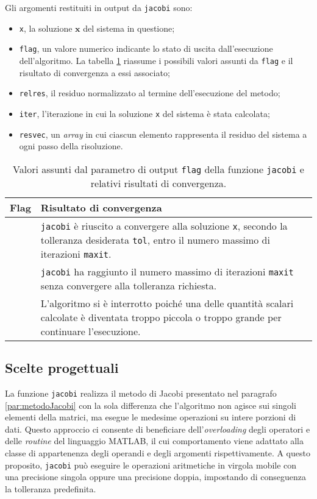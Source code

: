 Gli argomenti restituiti in output da \lstinline|jacobi| sono:
\begin{itemize}
    \item \lstinline|x|, la soluzione $\mathbf{x}$ del sistema in questione;
    \item \lstinline|flag|, un valore numerico indicante lo stato di uscita dall'esecuzione dell'algoritmo. La tabella \ref{tab:flagJacobi} riassume i possibili valori assunti da \lstinline|flag| e il risultato di convergenza a essi associato;
     \item \lstinline|relres|, il residuo normalizzato al termine dell'esecuzione del metodo;
    \item \lstinline|iter|, l'iterazione in cui la soluzione \lstinline|x| del sistema \`e stata calcolata;
    \item \lstinline|resvec|, un \textit{array} in cui ciascun elemento rappresenta il residuo del sistema a ogni passo della risoluzione.
\end{itemize}
\begin{table}[htbp]
    \renewcommand{\arraystretch}{1.2}
    \centering
    \begin{tabularx}{\textwidth}{@{} >{\centering\arraybackslash}m{1.5cm} X @{}}
        \toprule
        Flag & Risultato di convergenza \\
        \midrule
        0 & \lstinline{jacobi} è riuscito a convergere alla soluzione \lstinline{x}, secondo la tolleranza desiderata \lstinline{tol}, entro il numero massimo di iterazioni \lstinline{maxit}. \\
        \addlinespace
        1 & \lstinline{jacobi} ha raggiunto il numero massimo di iterazioni \lstinline{maxit} senza convergere alla tolleranza richiesta. \\
        \addlinespace
        2 & L'algoritmo si è interrotto poiché una delle quantità scalari calcolate è diventata troppo piccola o troppo grande per continuare l'esecuzione. \\
        \bottomrule
    \end{tabularx}
    \caption{Valori assunti dal parametro di output \lstinline{flag} della funzione \lstinline{jacobi} e relativi risultati di convergenza.}
    \label{tab:flagJacobi}
\end{table}
\subsection{Scelte progettuali}
La funzione \lstinline{jacobi} realizza il metodo di Jacobi presentato nel paragrafo \ref{par:metodoJacobi} con la sola differenza che l'algoritmo non agisce sui 
singoli elementi della matrici, ma esegue le medesime operazioni su intere porzioni di dati.\newline
Questo approccio ci consente di beneficiare dell'\textit{overloading} degli operatori e delle \textit{routine} del linguaggio MATLAB, il cui comportamento viene adattato
alla classe di appartenenza degli operandi e degli argomenti rispettivamente.\newline
A questo proposito, \lstinline{jacobi} pu\`o eseguire le operazioni aritmetiche in virgola mobile con una precisione singola oppure una precisione 
doppia, impostando di conseguenza la tolleranza predefinita.

